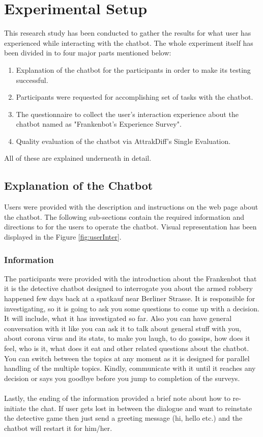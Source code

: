 \section{Experimental Setup}
This research study has been conducted to gather the results for what user has experienced while interacting with the chatbot. The whole experiment itself has been divided in to four major parts mentioned below:
\begin{enumerate}
    \item Explanation of the chatbot for the participants in order to make its testing successful.
    \item Participants were requested for accomplishing set of tasks with the chatbot.
    \item The questionnaire to collect the user's interaction experience about the chatbot named as "Frankenbot's Experience Survey".
    \item Quality evaluation of the chatbot via AttrakDiff's Single Evaluation.
\end{enumerate} 
All of these are explained underneath in detail.

\subsection{Explanation of the Chatbot}
Users were provided with the description and instructions on the web page about the chatbot. The following sub-sections contain the required information and directions to for the users to operate the chatbot. Visual representation has been displayed in the Figure \ref{fig:userInter}.

\subsubsection*{Information}
The participants were provided with the introduction about the Frankenbot that it is the detective chatbot designed to interrogate you about the armed robbery happened few days back at a spatkauf near Berliner Strasse. It is responsible for investigating, so it is going to ask you some questions to come up with a decision. It will include, what it has investigated so far. Also you can have general conversation with it like you can ask it to talk about general stuff with you, about corona virus and its stats, to make you laugh, to do gossips, how does it feel, who is it, what does it eat and other related questions about the chatbot. You can switch between the topics at any moment as it is designed for parallel handling of the multiple topics. Kindly, communicate with it until it reaches any decision or says you goodbye before you jump to completion of the surveys.
\\~\\
Lastly, the ending of the information provided a brief note about how to re-initiate the chat. If user gets lost in between the dialogue and want to reinstate the detective game then just send a greeting message (hi, hello etc.) and the chatbot will restart it for him/her.

